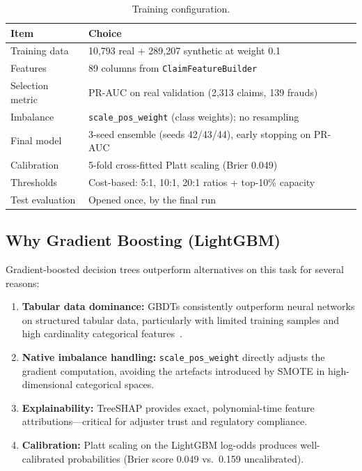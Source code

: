 \documentclass[12pt,a4paper]{article}
\begin{document}
\begin{table}[H]
\centering
\caption{Training configuration.}
\label{tab:training_config}
\begin{tabular}{@{}lp{10cm}@{}}
\toprule
\textbf{Item} & \textbf{Choice} \\
\midrule
Training data   & 10,793 real + 289,207 synthetic at weight 0.1 \\
Features        & 89 columns from \texttt{ClaimFeatureBuilder} \\
Selection metric & PR-AUC on real validation (2,313 claims, 139 frauds) \\
Imbalance       & \texttt{scale\_pos\_weight} (class weights); no resampling \\
Final model     & 3-seed ensemble (seeds 42/43/44), early stopping on PR-AUC \\
Calibration     & 5-fold cross-fitted Platt scaling (Brier 0.049) \\
Thresholds      & Cost-based: 5:1, 10:1, 20:1 ratios + top-10\% capacity \\
Test evaluation & Opened once, by the final run \\
\bottomrule
\end{tabular}
\end{table}

\subsection{Why Gradient Boosting (LightGBM)}

Gradient-boosted decision trees outperform alternatives on this task for several reasons:

\begin{enumerate}
    \item \textbf{Tabular data dominance:} GBDTs consistently outperform neural networks on structured tabular data, particularly with limited training samples and high cardinality categorical features~\cite{ref:grinsztajn2022}.
    \item \textbf{Native imbalance handling:} \texttt{scale\_pos\_weight} directly adjusts the gradient computation, avoiding the artefacts introduced by SMOTE in high-dimensional categorical spaces.
    \item \textbf{Explainability:} TreeSHAP provides exact, polynomial-time feature attributions---critical for adjuster trust and regulatory compliance.
    \item \textbf{Calibration:} Platt scaling on the LightGBM log-odds produces well-calibrated probabilities (Brier score 0.049 vs.\ 0.159 uncalibrated).
\end{enumerate}
\end{document}
